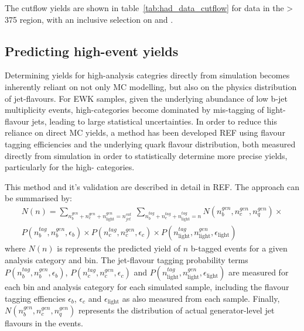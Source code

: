 The cutflow yields are shown in table~\ref{tab:had_data_cutflow} for data in the
\HT > 375 \gev region, with an inclusive selection on \nj and \nb.

\subsection{Predicting high-\nb event yields}
\label{sec:formula_method}

Determining yields for high-\nb analysis categries directly from simulation
becomes
inherently reliant on not only MC modelling, but also on the physics
distribution of jet-flavours. For EWK samples, given the underlying abundance of
low b-jet multiplicity events, high-\nb categories become dominated by
mis-tagging of light-flavour jets, leading to large statistical uncertainties.
In order to reduce this reliance on direct MC yields, a method has been
developed REF using flavour tagging efficiencies and the underlying quark
flavour distribution, both measured directly from simulation in order to
statistically determine more precise yields, particularly for the high-\nb
categories.

This method and it's validation are described in detail in REF. The approach can
be summarised by:
% 
\begin{equation}
\begin{split}
N(n) = \sum_{n_b^{gen} + n_c^{gen} + n_{\text{light}}^{gen} = n_{jet}^{cat}}\:
\sum_{n_b^{tag} + n_c^{tag} + n_{\text{light}}^{tag} = n}
N(n_b^{gen}, n_c^{gen}, n_q^{gen}) \times \\
P(n_b^{tag}, n_b^{gen}, \epsilon_{b}) \times
P(n_c^{tag}, n_c^{gen}, \epsilon_{c}) \times
P(n_{\text{light}}^{tag}, n_{\text{light}}^{gen}, \epsilon_{\text{light}})
\end{split}
\end{equation}
% 
where $N(n)$ is represents the predicted yield of $n$ b-tagged events for a
given
analysis category and \HT bin. The jet-flavour tagging probability
terms $P(n_b^{tag}, n_b^{gen}, \epsilon_{b})$,
$P(n_c^{tag}, n_c^{gen}, \epsilon_{c})$ and 
$P(n_{\text{light}}^{tag}, n_{\text{light}}^{gen}, \epsilon_{\text{light}})$ are measured for each \HT bin and
analysis category for each simulated sample, including the flavour tagging
effiencies $\epsilon_b$, $\epsilon_c$ and $\epsilon_{\text{light}}$ as also measured from
each sample. Finally, $N(n_b^{gen}, n_c^{gen}, n_q^{gen})$ represents the
distribution of actual generator-level jet flavours in the events.

